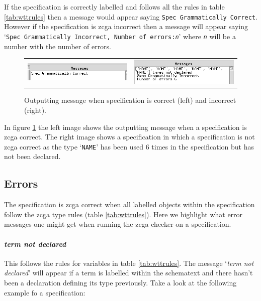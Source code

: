 If the specification is correctly labelled and follows all the rules in table \ref{tab:wttrules} then a message would appear saying \texttt{Spec Grammatically Correct}. However if the specification is \gls{zcga} incorrect then a message will appear saying `\texttt{Spec Grammatically Incorrect, Number of errors:\emph{n}}' where \texttt{\emph{n}} will be a number with the number of errors.

\begin{figure}[H]
\begin{tabular}{c c}
\includegraphics[scale=0.5]{Figures/zcga/zcgacorrect.png} 
& \includegraphics[scale=0.5]{Figures/zcga/zcgaincorrect.png}
\end{tabular}
\caption{Outputting message when specification is correct (left) and incorrect (right).\label{fig:correctandincorrect}}
\end{figure}

In figure \ref{fig:correctandincorrect} the left image shows the outputting message when a specification is \gls{zcga} correct. The right image shows a specification in which a specification is not \gls{zcga} correct as the type `\texttt{NAME}' has been used 6 times in the specification but has not been declared.

\subsection{Errors}
\label{subsec:zcgaerrors}

The specification is \gls{zcga} correct when all labelled objects within the specification follow the \gls{zcga} type rules (table \ref{tab:wttrules}). Here we highlight what error messages one might get when running the \gls{zcga} checker on a specification.


\paragraph{\emph{term not declared}}

This follows the rules for variables in table \ref{tab:wttrules}. The message `\emph{term not declared}' will appear if a term is labelled within the schematext and there hasn't been a declaration defining its type previously. Take a look at the following example fo a specification:

